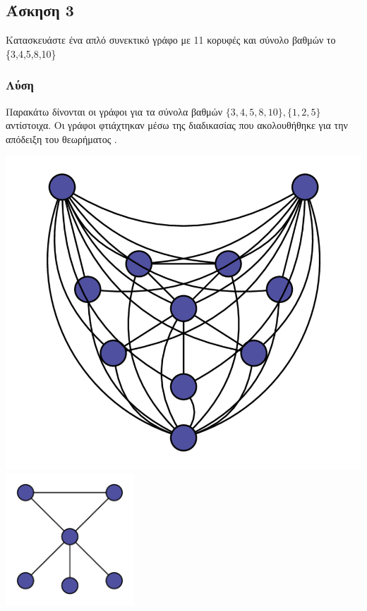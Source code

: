 \newpage\subsection*{Άσκηση 3}

Κατασκευάστε ένα απλό συνεκτικό γράφο με 11 κορυφές και σύνολο βαθμών το \{3,4,5,8,10\}

\subsubsection*{Λύση}

Παρακάτω δίνονται οι γράφοι για τα σύνολα βαθμών $\{3,4,5,8,10\}, \{1,2,5\}$ αντίστοιχα. Οι γράφοι φτιάχτηκαν
μέσω της διαδικασίας που ακολουθήθηκε για την απόδειξη του θεωρήματος .

\begin{center}
    \includegraphics[width=.34\textwidth]{./exercise3/diagrams/d1.png} \hspace{3cm}
    \includegraphics[height=5cm, width=.24\textwidth]{./exercise3/diagrams/d3.png}
\end{center}
